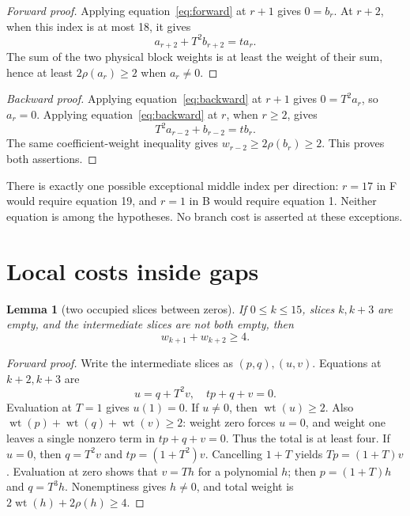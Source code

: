 \documentclass{article}
\newtheorem{lemma}{Lemma}
\DeclareMathOperator{\wt}{wt}
\begin{document}
\begin{proof}[Forward proof]
  Applying equation~\eqref{eq:forward} at \(r + 1\) gives \(0 = b_r\). At \(r + 2\), when this
  index is at most 18, it gives
  \begin{equation}
    a_{r+2} + T^2 b_{r+2} = t a_r.
  \end{equation}
  The sum of the two physical block weights is at least the weight of their sum, hence at least
  \(2\rho(a_r) \ge 2\) when \(a_r \ne 0\).
\end{proof}

\begin{proof}[Backward proof]
  Applying equation~\eqref{eq:backward} at \(r + 1\) gives \(0 = T^2 a_r\), so \(a_r = 0\).
  Applying equation~\eqref{eq:backward} at \(r\), when \(r \ge 2\), gives
  \begin{equation}
    T^2 a_{r-2} + b_{r-2} = t b_r.
  \end{equation}
  The same coefficient-weight inequality gives \(w_{r-2} \ge 2\rho(b_r) \ge 2\). This proves both
  assertions.
\end{proof}

There is exactly one possible exceptional middle index per direction: \(r = 17\) in F would
require equation 19, and \(r = 1\) in B would require equation 1. Neither equation is among the
hypotheses. No branch cost is asserted at these exceptions.

\section{Local costs inside gaps}\label{sec:gaps}

\begin{lemma}[two occupied slices between zeros]\label{lem:two}
  If \(0 \le k \le 15\), slices \(k, k + 3\) are empty, and the intermediate slices are not both
  empty, then
  \begin{equation}
    w_{k+1} + w_{k+2} \ge 4.
  \end{equation}
\end{lemma}

\begin{proof}[Forward proof]
  Write the intermediate slices as \((p,q), (u,v)\). Equations at \(k + 2, k + 3\) are
  \begin{equation}
    u = q + T^2 v, \quad tp + q + v = 0.
  \end{equation}
  Evaluation at \(T = 1\) gives \(u(1) = 0\). If \(u \ne 0\), then \(\wt(u) \ge 2\). Also
  \(\wt(p) + \wt(q) + \wt(v) \ge 2\): weight zero forces \(u = 0\), and weight one leaves a single
  nonzero term in \(tp + q + v = 0\). Thus the total is at least four. If \(u = 0\), then
  \(q = T^2 v\) and \(tp = (1 + T^2)v\). Cancelling \(1 + T\) yields \(Tp = (1 + T)v\). Evaluation
  at zero shows that \(v = Th\) for a polynomial \(h\); then \(p = (1 + T)h\) and \(q = T^3 h\).
  Nonemptiness gives \(h \ne 0\), and total weight is \(2\wt(h) + 2\rho(h) \ge 4\).
\end{proof}
\end{document}
